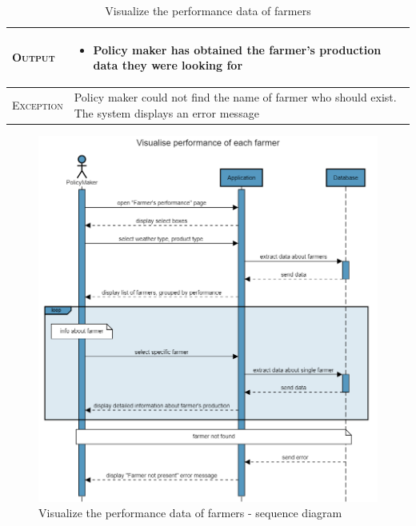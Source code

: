 \begin{table}[H]
\begin{tabular}{|l|p{}|}
    	\hline %
    	\textsc{Output}             &  \begin{itemize}
    	    \item Policy maker has obtained the farmer's production data they were looking for
    	\end{itemize}\\
    	\hline %
    	\textsc{Exception}         &  Policy maker could not find the name of farmer who should exist. The system displays an error message\\
    	\hline %
        
    \end{tabular}
    \caption{\label{tab:visualize_farmer_performance}Visualize the performance data of farmers} 
\end{table}

\newpage

\begin{figure}[H]
    \centering
    \includegraphics[scale=0.55]{Images/Sequence diagrams/SE2 - visualize performance (pm).png}
    \caption{Visualize the performance data of farmers - sequence diagram}
    \label{fig:seq_diag_visualize_performance}
\end{figure}


